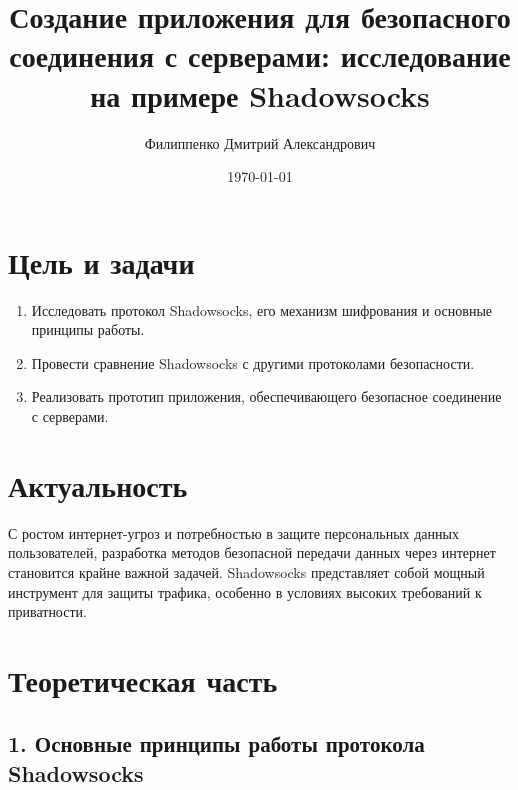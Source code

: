 \documentclass{SCWorks}
\begin{document}

\title{Создание приложения для безопасного соединения с серверами: исследование на примере Shadowsocks}


\author{Филиппенко Дмитрий Александрович}




\date{\today}
\maketitle



\section*{Цель и задачи}

\begin{enumerate}
    \item Исследовать протокол Shadowsocks, его механизм шифрования и основные принципы работы.
    \item Провести сравнение Shadowsocks с другими протоколами безопасности.
    \item Реализовать прототип приложения, обеспечивающего безопасное соединение с серверами.
\end{enumerate}

\section*{Актуальность}

С ростом интернет-угроз и потребностью в защите персональных данных пользователей, разработка методов безопасной передачи данных через интернет становится крайне важной задачей. Shadowsocks представляет собой мощный инструмент для защиты трафика, особенно в условиях высоких требований к приватности.

\newpage

\section*{Теоретическая часть}

\subsection*{1. Основные принципы работы протокола Shadowsocks}
\end{document}
